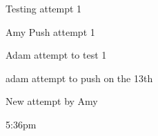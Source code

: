 Testing attempt 1


Amy Push attempt 1

Adam attempt to test 1

adam attempt to push on the 13th


New attempt by Amy

5:36pm
